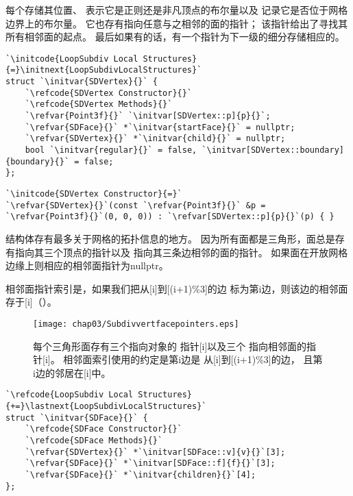 每个存储其位置、
表示它是正则还是非凡顶点的布尔量以及
记录它是否位于网格边界上的布尔量。
它也存有指向任意与之相邻的面的指针；
该指针给出了寻找其所有相邻面的起点。
最后如果有的话，有一个指针为下一级的细分存储相应的。
\begin{lstlisting}
`\initcode{LoopSubdiv Local Structures}{=}\initnext{LoopSubdivLocalStructures}`
struct `\initvar{SDVertex}{}` {
    `\refcode{SDVertex Constructor}{}`
    `\refcode{SDVertex Methods}{}`
    `\refvar{Point3f}{}` `\initvar[SDVertex::p]{p}{}`;
    `\refvar{SDFace}{}` *`\initvar{startFace}{}` = nullptr;
    `\refvar{SDVertex}{}` *`\initvar{child}{}` = nullptr;
    bool `\initvar{regular}{}` = false, `\initvar[SDVertex::boundary]{boundary}{}` = false;
};
\end{lstlisting}
\begin{lstlisting}
`\initcode{SDVertex Constructor}{=}`
`\refvar{SDVertex}{}`(const `\refvar{Point3f}{}` &p = `\refvar{Point3f}{}`(0, 0, 0)) : `\refvar[SDVertex::p]{p}{}`(p) { }
\end{lstlisting}

结构体存有最多关于网格的拓扑信息的地方。
因为所有面都是三角形，面总是存有指向其三个顶点的指针以及
指向其三条边相邻的面的指针。
如果面在开放网格边缘上则相应的相邻面指针为{\ttfamily nullptr}。

相邻面指针索引是，如果我们把从{\ttfamily{}[i]}到{\ttfamily{}[(i+1)\%3]}的边
标为第{\ttfamily i}边，则该边的相邻面存于{\ttfamily{}[i]}（）。
\begin{figure}[htbp]
    \centering\texttt{[image: chap03/Subdivvertfacepointers.eps]}
    \caption{每个三角形面存有三个指向\protect{}对象的
    指针{\ttfamily\protect{}[i]}以及三个
    指向相邻面的指针{\ttfamily\protect{}[i]}。
    相邻面索引使用的约定是第{\ttfamily i}边是
    从{\ttfamily\protect{}[i]}到{\ttfamily\protect{}[(i+1)\%3]}的边，
    且第{\ttfamily i}边的邻居在{\ttfamily\protect{}[i]}中。}
    \label{fig:3.27}
\end{figure}

\begin{lstlisting}
`\refcode{LoopSubdiv Local Structures}{+=}\lastnext{LoopSubdivLocalStructures}`
struct `\initvar{SDFace}{}` {
    `\refcode{SDFace Constructor}{}`
    `\refcode{SDFace Methods}{}`
    `\refvar{SDVertex}{}` *`\initvar[SDFace::v]{v}{}`[3];
    `\refvar{SDFace}{}` *`\initvar[SDFace::f]{f}{}`[3];
    `\refvar{SDFace}{}` *`\initvar{children}{}`[4];
};
\end{lstlisting}

